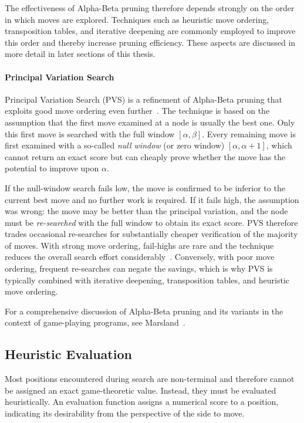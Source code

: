 The effectiveness of Alpha-Beta pruning therefore depends strongly on the order
in which moves are explored. Techniques such as heuristic move ordering,
transposition tables, and iterative deepening are commonly employed to improve
this order and thereby increase pruning efficiency. These aspects are discussed
in more detail in later sections of this thesis.

\paragraph{Principal Variation Search}
Principal Variation Search (PVS) is a refinement of Alpha-Beta pruning that
exploits good move ordering even further~\cite{marsland1982parallel,
pearl1980scout}. The technique is based on the assumption that the first move
examined at a node is usually the best one. Only this first move is searched
with the full window $[\alpha, \beta]$. Every remaining move is first examined
with a so-called \emph{null window} (or zero window) $[\alpha, \alpha + 1]$,
which cannot return an exact score but can cheaply prove whether the move has
the potential to improve upon $\alpha$.

If the null-window search fails low, the move is confirmed to be inferior to
the current best move and no further work is required. If it fails high, the
assumption was wrong: the move may be better than the principal variation, and
the node must be \emph{re-searched} with the full window to obtain its exact
score. PVS therefore trades occasional re-searches for substantially cheaper
verification of the majority of moves. With strong move ordering, fail-highs
are rare and the technique reduces the overall search effort
considerably~\cite{reinefeld1983negascout}. Conversely, with poor move
ordering, frequent re-searches can negate the savings, which is why PVS is
typically combined with iterative deepening, transposition tables, and
heuristic move ordering.

For a comprehensive discussion of Alpha-Beta pruning and its variants in the
context of game-playing programs, see Marsland~\cite{marsland1986review}.

\subsection{Heuristic Evaluation}

Most positions encountered during search are non-terminal and therefore cannot be
assigned an exact game-theoretic value. Instead, they must be evaluated
heuristically. An evaluation function assigns a numerical score to a position,
indicating its desirability from the perspective of the side to move.

